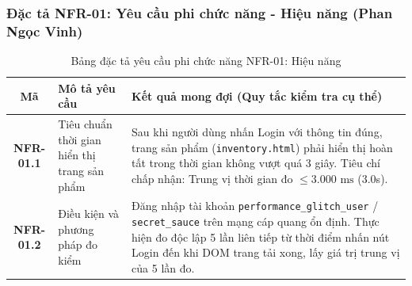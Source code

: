 \documentclass[a4paper]{article}
\begin{document}
\subsubsection{Đặc tả NFR-01: Yêu cầu phi chức năng - Hiệu năng (Phan Ngọc Vinh)}
\begin{table}[H]
\centering
\small
\begin{tabularx}{\textwidth}{|c|p{4.5cm}|X|}
\hline
\textbf{Mã} & \textbf{Mô tả yêu cầu} & \textbf{Kết quả mong đợi (Quy tắc kiểm tra cụ thể)} \\ \hline
\textbf{NFR-01.1} & Tiêu chuẩn thời gian hiển thị trang sản phẩm & Sau khi người dùng nhấn Login với thông tin đúng, trang sản phẩm (\texttt{inventory.html}) phải hiển thị hoàn tất trong thời gian không vượt quá 3 giây. Tiêu chí chấp nhận: Trung vị thời gian đo $\le 3.000\text{ ms}$ (3.0s). \\ \hline
\textbf{NFR-01.2} & Điều kiện và phương pháp đo kiểm & Đăng nhập tài khoản \texttt{performance\_glitch\_user} / \texttt{secret\_sauce} trên mạng cáp quang ổn định. Thực hiện đo độc lập 5 lần liên tiếp từ thời điểm nhấn nút Login đến khi DOM trang tải xong, lấy giá trị trung vị của 5 lần đo. \\ \hline
\end{tabularx}
\caption{Bảng đặc tả yêu cầu phi chức năng NFR-01: Hiệu năng}
\end{table}

\clearpage
\end{document}
